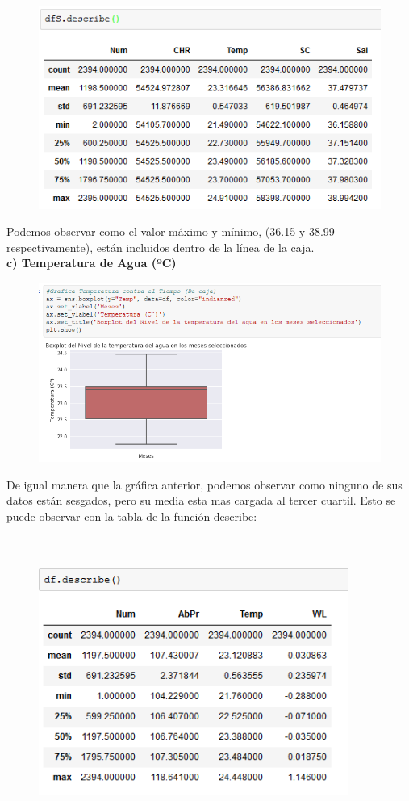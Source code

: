 \documentclass[12pt]{article}
\begin{document}
\begin{figure}[h]
    \centering
\includegraphics[width=4.5in]{dfSdescribe.png}
\end{figure}

Podemos observar como el valor máximo y mínimo, (36.15 y 38.99 respectivamente), están incluidos dentro de la línea de la caja.  \\

\noindent\textbf {c) Temperatura de Agua (ºC)}
\begin{figure}[h]
    \centering
\includegraphics[width=5in]{Caja3.png}
\end{figure}

De igual manera que la gráfica anterior, podemos observar como ninguno de sus datos están sesgados, pero su media esta mas cargada al tercer cuartil. Esto se puede observar con la tabla de la función describe: \\ \\ \\

\begin{figure}[h]
    \centering
\includegraphics[width=4in]{dfdescribe.png}
\end{figure}
\end{document}
